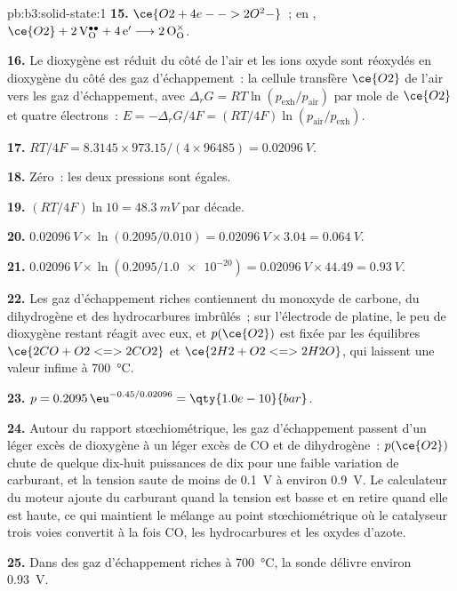 \begin{solution}{pb:b3:solid-state:1}
\textbf{15.} $\ce{O2 + 4e- -> 2O^2-}$~; en , $\ce{O2} + \mathrm{2\,V_O^{\bullet\bullet} + 4\,e'} \longrightarrow \mathrm{2\,O_O^{\times}}$.

\textbf{16.} Le dioxygène est réduit du côté de l'air et les ions oxyde sont
réoxydés en dioxygène du côté des gaz d'échappement~: la cellule transfère $\ce{O2}$ de l'air vers les gaz d'échappement, avec
$\Delta_rG = RT\ln(p_{\mathrm{exh}}/p_{\mathrm{air}})$ par mole de $\ce{O2}$ et quatre électrons~: $E = -\Delta_rG/4F = (RT/4F)\ln(p_{\mathrm{air}}/p_{\mathrm{exh}})$.

\textbf{17.} $RT/4F = 8.3145 \times 973.15/(4 \times 96485) = \qty{0.02096}{V}$.

\textbf{18.} Zéro~: les deux pressions sont égales.

\textbf{19.} $(RT/4F)\ln 10 = \qty{48.3}{mV}$ par décade.

\textbf{20.} $\qty{0.02096}{V} \times \ln(0.2095/0.010) = \qty{0.02096}{V} \times 3.04 = \qty{0.064}{V}$.

\textbf{21.} $\qty{0.02096}{V} \times \ln(0.2095/\num{1.0e-20}) = \qty{0.02096}{V} \times 44.49 = \qty{0.93}{V}$.

\textbf{22.} Les gaz d'échappement riches contiennent du monoxyde de
carbone, du dihydrogène et des hydrocarbures imbrûlés~; sur l'électrode de
platine, le peu de dioxygène restant réagit avec eux, et $p(\ce{O2})$ est fixée par les équilibres $\ce{2CO + O2 <=> 2CO2}$ et $\ce{2H2 + O2 <=> 2H2O}$, qui laissent une valeur
infime à \qty{700}{\celsius}.

\textbf{23.} $p = 0.2095\,\eu^{-0.45/0.02096} = \qty{1.0e-10}{bar}$.

\textbf{24.} Autour du rapport stœchiométrique, les gaz d'échappement
passent d'un léger excès de dioxygène à un léger excès de CO et de
dihydrogène~: $p(\ce{O2})$ chute de quelque dix-huit puissances de dix pour une faible variation de
carburant, et la tension saute de moins de \qty{0.1}{V} à environ
\qty{0.9}{V}. Le calculateur du moteur ajoute du carburant quand la tension
est basse et en retire quand elle est haute, ce qui maintient le mélange au
point stœchiométrique où le catalyseur trois voies convertit à la fois CO,
les hydrocarbures et les oxydes d'azote.

\textbf{25.} Dans des gaz d'échappement riches à \qty{700}{\celsius}, la sonde délivre environ \qty{0.93}{V}.
\end{solution}
